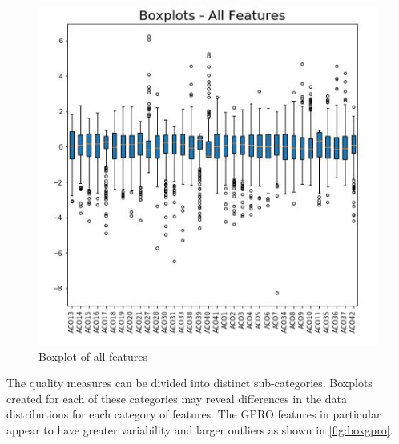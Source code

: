 \documentclass[conference]{IEEEtran}
\begin{document}
\begin{figure}[H]
    \centering
    \includegraphics{BoxPlots_ALL.jpg}
    \caption{Boxplot of all features}
    \label{fig:boxall}
\end{figure}
The quality measures can be divided into distinct sub-categories. Boxplots created for each of these categories may reveal differences in the data distributions for each category of features. The GPRO features in particular appear to have greater variability and larger outliers as shown in \ref{fig:boxgpro}.
\end{document}
